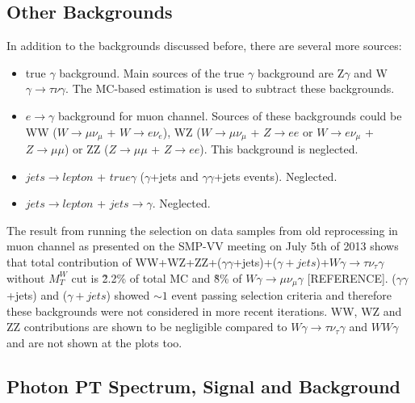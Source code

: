 \subsection{Other Backgrounds}
In addition to the backgrounds discussed before, there are several more sources:
\begin{itemize}
   \item true $\gamma$ background. Main sources of the true $\gamma$ background are Z$\gamma$ and W$\gamma \rightarrow \tau \nu \gamma$. The MC-based estimation is used to subtract these backgrounds.
   \item $e \rightarrow \gamma$ background for muon channel. Sources of these backgrounds could be WW ($W \rightarrow \mu\nu_{\mu}$ + $W \rightarrow e\nu_e$), WZ ($W \rightarrow \mu\nu_{\mu}$ + $Z \rightarrow ee$ or $W \rightarrow e\nu_{\mu}$ + $Z \rightarrow \mu\mu$) or ZZ ($Z \rightarrow \mu\mu$ + $Z \rightarrow ee$). This background is neglected.
   \item $jets \rightarrow lepton$ + $true \gamma$ ($\gamma$+jets and $\gamma\gamma$+jets events). Neglected.
   \item $jets \rightarrow lepton$ + $jets \rightarrow \gamma$. Neglected. 
\end{itemize}
The result from running the selection on data samples from old reprocessing in muon channel as presented on the SMP-VV meeting on July 5th of 2013 shows that total contribution of WW+WZ+ZZ+($\gamma\gamma$+jets)+($\gamma+jets$)+$W\gamma \rightarrow \tau\nu_{\tau}\gamma$ without $M_T^W$ cut is \~2.2\% of total MC and \~8\% of $W\gamma \rightarrow \mu\nu_{\mu}\gamma$ [REFERENCE]. ($\gamma\gamma$+jets) and ($\gamma+jets$) showed $\sim 1$ event passing selection criteria and therefore these backgrounds were not considered in more recent iterations. WW, WZ and ZZ contributions are shown to be negligible compared to $W\gamma \rightarrow \tau\nu_{\tau}\gamma$ and $WW\gamma$ and are not shown at the plots too.\\



\subsection{Photon PT Spectrum, Signal and Background}

